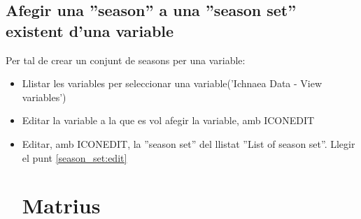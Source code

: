\subsection{Afegir una ''season'' a una ''season set'' existent d'una variable}
Per tal de crear un conjunt de seasons per una variable:
\begin{itemize}
\item Llistar les variables per seleccionar una variable('Ichnaea Data - View variables')
\item Editar la variable a la que es vol afegir la variable, amb ICONEDIT
\item Editar, amb ICONEDIT, la ''season set'' del llistat ''List of season set''.
Llegir el punt \ref{season_set:edit}


\section{Matrius}

\end{itemize}
